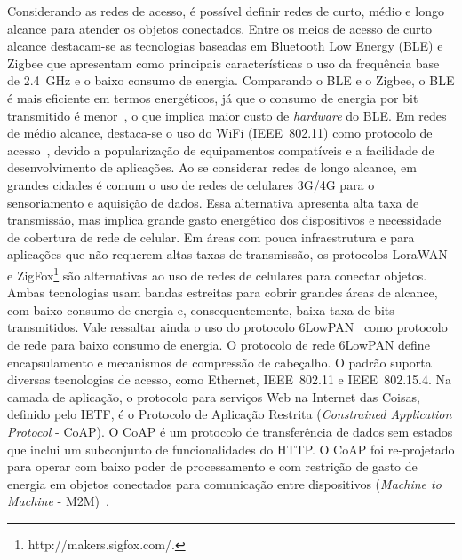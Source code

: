 \documentclass[12pt]{article}
\begin{document}
Considerando as redes de acesso, é possível definir redes de curto, médio e longo alcance para atender os objetos conectados. Entre os meios de acesso de curto alcance destacam-se as tecnologias baseadas em Bluetooth Low Energy (BLE) e Zigbee que apresentam como principais características o uso da frequência base de 2.4~GHz e o baixo consumo de energia. Comparando o BLE e o Zigbee, o BLE é mais eficiente em termos energéticos, já que o consumo de energia por bit transmitido é menor~\cite{iot-protocols}, o que implica maior custo de {\it hardware} do BLE. Em redes de médio alcance, destaca-se o uso do WiFi (IEEE~802.11) como protocolo de acesso~\cite{wifi-iot}, devido a popularização de equipamentos compatíveis e a facilidade de desenvolvimento de aplicações. Ao se considerar redes de longo alcance, em grandes cidades é comum o uso de redes de celulares 3G/4G para o sensoriamento e aquisição de dados. Essa alternativa apresenta alta taxa de transmissão, mas implica grande gasto energético dos dispositivos e necessidade de cobertura de rede de celular. Em áreas com pouca infraestrutura e para aplicações que não requerem altas taxas de transmissão, os protocolos LoraWAN~\cite{lorawan} e ZigFox\footnote{http://makers.sigfox.com/.} são alternativas ao uso de redes de celulares para conectar objetos. Ambas tecnologias usam bandas estreitas para cobrir grandes áreas de alcance, com baixo consumo de energia e, consequentemente, baixa taxa de bits transmitidos. Vale ressaltar ainda o uso do protocolo 6LowPAN~\cite{6lowpan} como protocolo de rede para baixo consumo de energia. O protocolo de rede 6LowPAN define encapsulamento e mecanismos de compressão de cabeçalho. O padrão suporta diversas tecnologias de acesso, como Ethernet, IEEE~802.11 e IEEE~802.15.4.
%
Na camada de aplicação, o protocolo para serviços Web na Internet das Coisas, definido pelo IETF, é o Protocolo de Aplicação Restrita ({\it Constrained Application Protocol} - CoAP). O CoAP é um protocolo de transferência de dados sem estados que inclui um subconjunto de funcionalidades do HTTP. O CoAP foi re-projetado para operar com baixo poder de processamento e com restrição de gasto de energia em objetos conectados para comunicação entre dispositivos ({\it Machine to Machine} - M2M)~\cite{iot-miguel,coap}.
\end{document}
